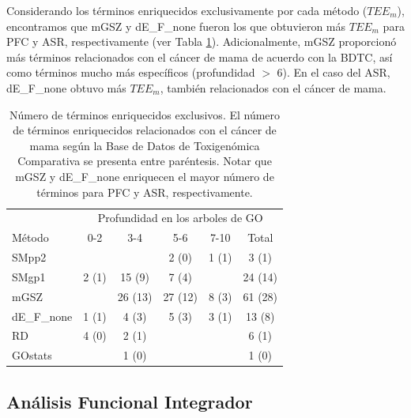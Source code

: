 \documentclass[12pt,twoside]{reedthesis}
\begin{document}
\par

Considerando los términos enriquecidos exclusivamente por cada método (\(TEE_m\)), encontramos que mGSZ y dE\_F\_none fueron los que obtuvieron más \(TEE_m\) para PFC y ASR, respectivamente (ver Tabla \ref{tab:eet}). Adicionalmente, mGSZ proporcionó más términos relacionados con el cáncer de mama de acuerdo con la BDTC, así como términos mucho más específicos (profundidad \(>\) 6). En el caso del ASR, dE\_F\_none obtuvo más \(TEE_m\), también relacionados con el cáncer de mama.
\begin{table}[!htbp]
\centering
\caption{Número de términos enriquecidos exclusivos. El número de términos enriquecidos relacionados con el cáncer de mama según la Base de Datos de Toxigenómica Comparativa se presenta entre paréntesis. Notar que mGSZ y dE\_F\_none enriquecen el mayor número de términos para PFC y ASR, respectivamente.}
\begin{tabular}{lccccc}
& \multicolumn{5}{c}{Profundidad en los arboles de GO} \\ \cline{2-6}
Método & 0-2 & 3-4 & 5-6 & 7-10 & Total \\
\hline
SMpp2 & & & 2 (0) & 1 (1) & 3 (1) \\
SMgp1 & 2 (1) & 15 (9) & 7 (4) & & 24 (14) \\
mGSZ & & 26 (13) & 27 (12) & 8 (3) & 61 (28) \\
dE\_F\_none & 1 (1) & 4 (3) & 5 (3) & 3 (1) & 13 (8) \\
RD & 4 (0) & 2 (1) & & & 6 (1) \\
GOstats & & 1 (0) & & & 1 (0) \\
\hline
\end{tabular}
\label{tab:eet}
\end{table}
\hypertarget{sec:ifa}{%
\subsection{Análisis Funcional Integrador}\label{sec:ifa}}

\par
\end{document}
